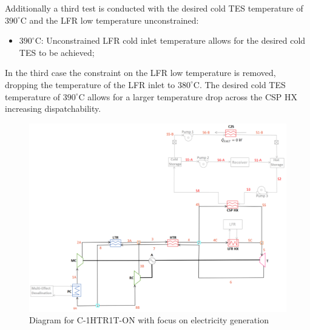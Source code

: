 \begin{paracol}{2}
Additionally a third test is conducted with the desired cold TES temperature of $390^{\circ}$C and the LFR low temperature unconstrained:

\begin{itemize}
    \item	$390^{\circ}$C: Unconstrained LFR cold inlet temperature allows for the desired cold TES to be achieved;
\end{itemize}

In the third case the constraint on the LFR low temperature is removed, dropping the temperature of the LFR inlet to $380^{\circ}$C. The desired cold TES temperature of $390^{\circ}$C allows for a larger temperature drop across the CSP HX increasing dispatchability.

\end{paracol}

\begin{figure}[H] 
    \widefigure
    \includegraphics[width=\linewidth]{Definitions/c-1htr1t-on.pdf}
    \caption{Diagram for C-1HTR1T-ON with focus on electricity generation\label{c-1htr1t-on}}
\end{figure}


